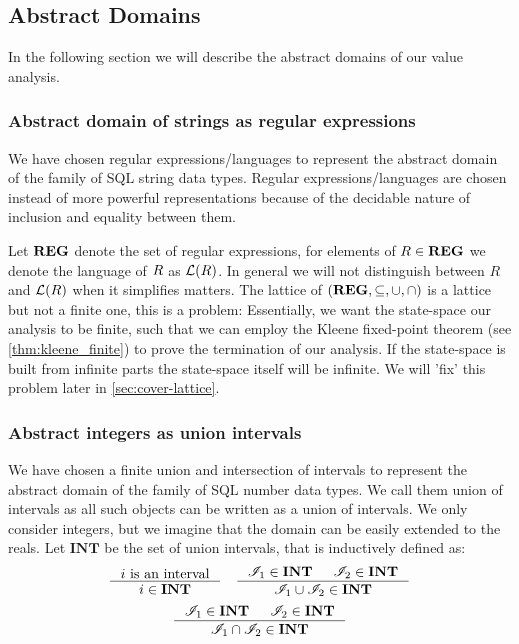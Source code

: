 \subsection{Abstract Domains}\label{subsec:abstract-domains}

In the following section we will describe the abstract domains of our value analysis.

\subsubsection{Abstract domain of strings as regular expressions}\label{subsubsec:abstract_domains_strings}
We have chosen regular expressions/languages to represent the abstract domain of the family of SQL string data types.
Regular expressions/languages are chosen instead of more powerful representations because of the decidable nature of inclusion and equality between them.

Let $\mathbf{REG}$ denote the set of regular expressions, for elements of $R \in \mathbf{REG}$ we denote the language of $R$ as $\mathcal{L}(R)$.
In general we will not distinguish between $R$ and $\mathcal{L}(R)$ when it simplifies matters.
The lattice of $(\mathbf{REG}, \subseteq, \cup, \cap)$ is a lattice but not a finite one, this is a problem: Essentially, we want the state-space our analysis to be finite, such that we can employ the Kleene fixed-point theorem (see \autoref{thm:kleene_finite}) to prove the termination of our analysis.
If the state-space is built from infinite parts the state-space itself will be infinite.
We will 'fix' this problem later in \autoref{sec:cover-lattice}.

\subsubsection{Abstract integers as union intervals}\label{subsubsec:abstract_domains_numbers} We have chosen a finite union and intersection of intervals to represent the abstract domain of the family of SQL number data types.
We call them union of intervals as all such objects can be written as a union of intervals.
We only consider integers, but we imagine that the domain can be easily extended to the reals.
Let $\mathbf{INT}$ be the set of union intervals, that is inductively defined as:
\[
    \inference{i \text{ is an interval}}{i \in \mathbf{INT}} \quad
    \inference{\mathscr{I}_1 \in \textbf{INT} & \mathscr{I}_2 \in \textbf{INT}}{\mathscr{I}_1 \cup  \mathscr{I}_2 \in \mathbf{INT}}
\]
\[
    \inference{\mathscr{I}_1 \in \textbf{INT} & \mathscr{I}_2 \in \textbf{INT}}{\mathscr{I}_1 \cap  \mathscr{I}_2 \in \mathbf{INT}}
\]

